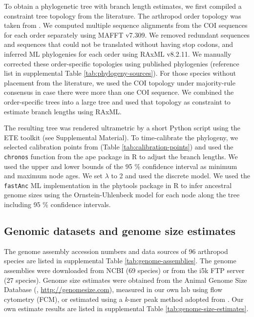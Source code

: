 To obtain a phylogenetic tree with branch length estimates, we first
compiled a constraint tree topology from the literature. The arthropod
order topology was taken from \citet{Misof2014}. We computed multiple
sequence alignments from the COI sequences for each order separately
using MAFFT v7.309. We removed redundant sequences and sequences that
could not be translated without having stop codons, and inferred ML
phylogenies for each order using RAxML v8.2.11. We manually corrected
these order-specific topologies using published phylogenies (reference
list in supplemental Table \ref{tab:phylogeny-sources}). For those species without placement from
the literature, we used the COI topology under majority-rule consensus
in case there were more than one COI sequence. We combined the
order-specific trees into a large tree and used that topology as
constraint to estimate branch lengths using RAxML.

The resulting tree was rendered ultrametric by a short Python script
using the ETE toolkit \citep{Huerta-Cepas2016} (see Supplemental Material). To
time-calibrate the phylogeny, we selected calibration points from
\citep{Misof2014} (Table \ref{tab:calibration-points}) and used the \texttt{chronos} function
from the ape package in R to adjust the branch lengths. We used the
upper and lower bounds of the 95 \% confidence interval as minimum and
maximum node ages. We set \(\lambda\) to 2 and used the discrete
model. We used the \texttt{fastAnc} ML implementation in the phytools
package \citep{Revell2012} in R to infer ancestral genome sizes using
the Ornstein-Uhlenbeck model for each node along the tree including 95
\% confidence intervals.

\subsection*{Genomic datasets and genome size
estimates}

The genome assembly accession numbers and data sources of 96 arthropod
species are listed in supplemental Table \ref{tab:genome-assemblies}. The genome assemblies were
downloaded from NCBI (69 species) or from the i5k FTP server (27
species). Genome size estimates were obtained from the Animal Genome
Size Database (\citet{Gregory2018}, \url{http://genomesize.com}),
measured in our own lab using flow cytometry (FCM), or estimated using a
\emph{k}-mer peak method adopted from \citet{Hozza2015}. Our own
estimate results are listed in supplemental Table
\ref{tab:genome-size-estimates}.

